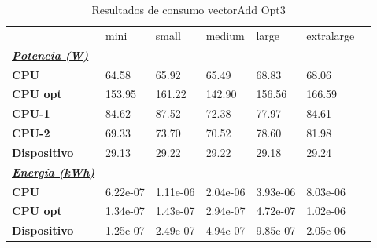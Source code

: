 \begin{table}[H]
    \centering
    \begin{tabular}{lllllll}
    \rowcolor[HTML]{DAE8FC} \ & mini & small & medium & 	large & 	extralarge \\
    \cellcolor[HTML]{DAE8FC} \textbf{\textbf{{\emph{{\underline{{Potencia (W)}}}}}}} &  &  &  & 	 & 	 \\
    \rowcolor[HTML]{EFEFEF} \cellcolor[HTML]{DAE8FC} \textbf{CPU} & 64.58 & 65.92 & 65.49 & 	68.83 & 	68.06 \\
    \cellcolor[HTML]{DAE8FC} \textbf{CPU opt} & 153.95 & 161.22 & 142.90 & 	156.56 & 	166.59 \\
    \rowcolor[HTML]{EFEFEF} \cellcolor[HTML]{DAE8FC} \textbf{\quad CPU-1} & 84.62 & 87.52 & 72.38 & 	77.97 & 	84.61 \\
    \cellcolor[HTML]{DAE8FC} \textbf{\quad CPU-2} & 69.33 & 73.70 & 70.52 & 	78.60 & 	81.98 \\
    \rowcolor[HTML]{EFEFEF} \cellcolor[HTML]{DAE8FC} \textbf{Dispositivo} & 29.13 & 29.22 & 29.22 & 	29.18 & 	29.24 \\
    \cellcolor[HTML]{DAE8FC} \textbf{\textbf{{\emph{{\underline{{Energía (kWh)}}}}}}} &  &  &  & 	 & 	 \\
    \rowcolor[HTML]{EFEFEF} \cellcolor[HTML]{DAE8FC} \textbf{CPU} & 6.22e-07 & 1.11e-06 & 2.04e-06 & 	3.93e-06 & 	8.03e-06 \\
    \cellcolor[HTML]{DAE8FC} \textbf{CPU opt} & 1.34e-07 & 1.43e-07 & 2.94e-07 & 	4.72e-07 & 	1.02e-06 \\
    \rowcolor[HTML]{EFEFEF} \cellcolor[HTML]{DAE8FC} \textbf{Dispositivo} & 1.25e-07 & 2.49e-07 & 4.94e-07 & 	9.85e-07 & 	2.05e-06 \\
    \end{tabular}
    \caption[Resultados de consumo vectorAdd Opt3]{{Resultados de consumo vectorAdd Opt3}}
    \label{table_test_vectorAdd_Opt3_hw_powerResults}
\end{table}